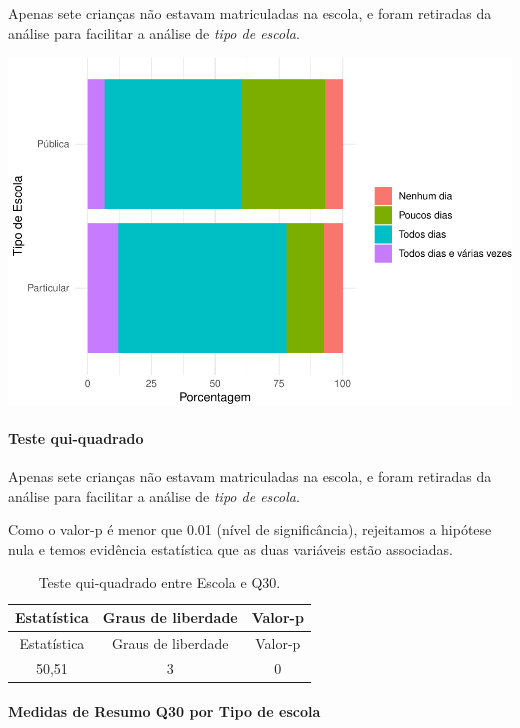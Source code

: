 \documentclass[]{article}
\let\oldparagraph\paragraph
\renewcommand{\paragraph}[1]{\oldparagraph{#1}\mbox{}}
\begin{document}
Apenas sete crianças não estavam matriculadas na escola, e foram retiradas da análise para facilitar a análise de \emph{tipo de escola}.

\begin{center}\includegraphics[width=0.75\linewidth]{relatorio_covid19_files/figure-latex/unnamed-chunk-998-1} \end{center}

\hypertarget{teste-qui-quadrado-86}{%
\paragraph{Teste qui-quadrado}\label{teste-qui-quadrado-86}}

Apenas sete crianças não estavam matriculadas na escola, e foram retiradas da análise para facilitar a análise de \emph{tipo de escola}.

Como o valor-p é menor que 0.01 (nível de significância), rejeitamos a hipótese nula e temos evidência estatística que as duas variáveis estão associadas.

\begin{longtable}[]{@{}ccc@{}}
\caption{\label{tab:unnamed-chunk-1000}Teste qui-quadrado entre Escola e Q30.}\tabularnewline
\toprule
Estatística & Graus de liberdade & Valor-p\tabularnewline
\midrule
\endfirsthead
\toprule
Estatística & Graus de liberdade & Valor-p\tabularnewline
\midrule
\endhead
50,51 & 3 & 0\tabularnewline
\bottomrule
\end{longtable}

\cleardoublepage

\hypertarget{medidas-de-resumo-q30-por-tipo-de-escola}{%
\paragraph{Medidas de Resumo Q30 por Tipo de escola}\label{medidas-de-resumo-q30-por-tipo-de-escola}}
\end{document}
